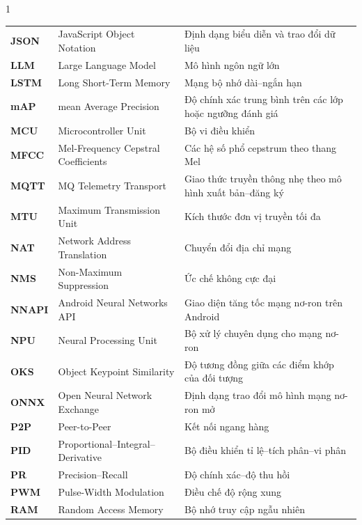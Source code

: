 \begin{spacing}{1}
\begin{longtable}{@{}>{\bfseries\color{HCMUTDarkBlue}}p{2.1cm}p{6.2cm}p{6.5cm}@{}}
  JSON   & JavaScript Object Notation                      & Định dạng biểu diễn và trao đổi dữ liệu \\
  LLM    & Large Language Model                            & Mô hình ngôn ngữ lớn \\
  LSTM   & Long Short-Term Memory                          & Mạng bộ nhớ dài--ngắn hạn \\
  mAP    & mean Average Precision                          & Độ chính xác trung bình trên các lớp hoặc ngưỡng đánh giá \\
  MCU    & Microcontroller Unit                            & Bộ vi điều khiển \\
  MFCC   & Mel-Frequency Cepstral Coefficients             & Các hệ số phổ cepstrum theo thang Mel \\
  MQTT   & MQ Telemetry Transport                          & Giao thức truyền thông nhẹ theo mô hình xuất bản--đăng ký \\
  MTU    & Maximum Transmission Unit                       & Kích thước đơn vị truyền tối đa \\
  NAT    & Network Address Translation                     & Chuyển đổi địa chỉ mạng \\
  NMS    & Non-Maximum Suppression                         & Ức chế không cực đại \\
  NNAPI  & Android Neural Networks API                     & Giao diện tăng tốc mạng nơ-ron trên Android \\
  NPU    & Neural Processing Unit                          & Bộ xử lý chuyên dụng cho mạng nơ-ron \\
  OKS    & Object Keypoint Similarity                      & Độ tương đồng giữa các điểm khớp của đối tượng \\
  ONNX   & Open Neural Network Exchange                    & Định dạng trao đổi mô hình mạng nơ-ron mở \\
  P2P    & Peer-to-Peer                                    & Kết nối ngang hàng \\
  PID    & Proportional--Integral--Derivative              & Bộ điều khiển tỉ lệ--tích phân--vi phân \\
  PR     & Precision--Recall                               & Độ chính xác--độ thu hồi \\
  PWM    & Pulse-Width Modulation                          & Điều chế độ rộng xung \\
  RAM    & Random Access Memory                            & Bộ nhớ truy cập ngẫu nhiên \\

\end{longtable}
\end{spacing}
